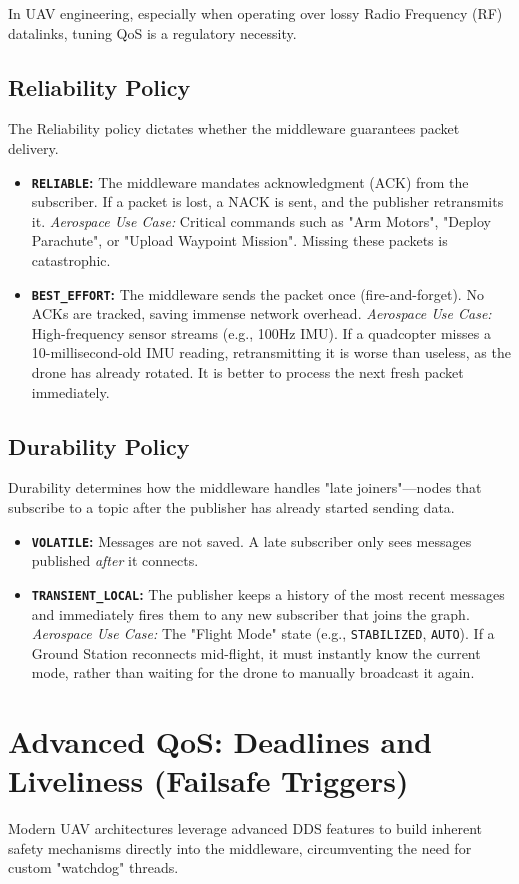 \documentclass{article}
\begin{document}
In UAV engineering, especially when operating over lossy Radio Frequency (RF) datalinks, tuning QoS is a regulatory necessity.

\subsection{Reliability Policy}
The Reliability policy dictates whether the middleware guarantees packet delivery.
\begin{itemize}
    \item \textbf{\texttt{RELIABLE}:} The middleware mandates acknowledgment (ACK) from the subscriber. If a packet is lost, a NACK is sent, and the publisher retransmits it. 
    \textit{Aerospace Use Case:} Critical commands such as "Arm Motors", "Deploy Parachute", or "Upload Waypoint Mission". Missing these packets is catastrophic.
    \item \textbf{\texttt{BEST\_EFFORT}:} The middleware sends the packet once (fire-and-forget). No ACKs are tracked, saving immense network overhead. 
    \textit{Aerospace Use Case:} High-frequency sensor streams (e.g., 100Hz IMU). If a quadcopter misses a 10-millisecond-old IMU reading, retransmitting it is worse than useless, as the drone has already rotated. It is better to process the next fresh packet immediately.
\end{itemize}

\subsection{Durability Policy}
Durability determines how the middleware handles "late joiners"---nodes that subscribe to a topic after the publisher has already started sending data.
\begin{itemize}
    \item \textbf{\texttt{VOLATILE}:} Messages are not saved. A late subscriber only sees messages published \textit{after} it connects.
    \item \textbf{\texttt{TRANSIENT\_LOCAL}:} The publisher keeps a history of the most recent messages and immediately fires them to any new subscriber that joins the graph.
    \textit{Aerospace Use Case:} The "Flight Mode" state (e.g., \texttt{STABILIZED}, \texttt{AUTO}). If a Ground Station reconnects mid-flight, it must instantly know the current mode, rather than waiting for the drone to manually broadcast it again.
\end{itemize}

\section{Advanced QoS: Deadlines and Liveliness (Failsafe Triggers)}
Modern UAV architectures leverage advanced DDS features to build inherent safety mechanisms directly into the middleware, 
circumventing the need for custom "watchdog" threads.
\end{document}
